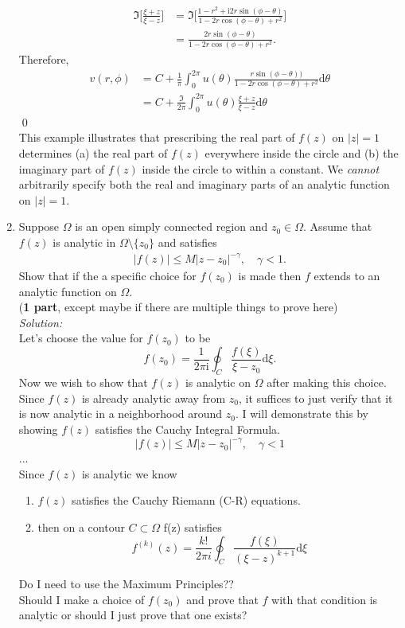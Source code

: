 \documentclass[10pt]{amsart}
\newcommand{\D}{\mathrm{d}}
\newcommand{\I}{\mathrm{i}}
\theoremstyle{nonumberplain}
\begin{document}
\begin{enumerate}[label={\bf {\arabic*}:}]
\begin{align*}
\Im \bigg[\frac {\xi + z}{\xi - z} \bigg] &= \Im \bigg[\frac {1 - r^2 + \I 2 r\sin(\phi - \theta)}{1 - 2r \cos (\phi - \theta) + r^2} \bigg] \\
	&= \frac {2 r\sin(\phi - \theta)}{1 - 2r \cos (\phi - \theta) + r^2}.
\end{align*}
Therefore, 
\begin{align*}
v(r, \phi) &= C + \frac 1 {\pi} \int_0^{2\pi} u(\theta) \frac{r\sin(\phi -\theta))}{1 - 2r \cos (\phi-\theta) + r^2} \D \theta \\
	&= C + \frac \Im {2\pi} \int_0^{2\pi} u(\theta) \frac {\xi + z}{\xi - z} \D \theta
\end{align*}
\qed \\
This example illustrates that prescribing the real part of $f(z)$ on $|z| = 1$ determines (a) the real part of $f(z)$ everywhere inside the circle and (b) the imaginary part of $f(z)$ inside the circle to within a constant.
We \textit{cannot} arbitrarily specify both the real and imaginary parts of an analytic function on $|z| = 1$.

\item Suppose $\Omega$ is an open simply connected region and $z_0 \in
  \Omega$.  Assume that $f(z)$ is analytic in $\Omega\setminus
  \{z_0\}$ and satisfies
  \begin{align*}
    |f(z)| \leq M |z - z_0|^{-\gamma}, \quad \gamma < 1.
  \end{align*}
  Show that if the a specific choice for $f(z_0)$ is made then $f$
  extends to an analytic function on $\Omega$. \\
(\textbf{1 part}, except maybe if there are multiple things to prove here) \\
\textit{Solution:} \\
Let's choose the value for $f(z_0)$ to be
$$f(z_0) = \frac 1 {2 \pi \I}\oint_C \frac {f(\xi)} {\xi - z_0} \D \xi.$$
Now we wish to show that $f(z)$ is analytic on $\Omega$ after making this choice.
Since $f(z)$ is already analytic away from $z_0$, it suffices to just verify that it is now analytic in a neighborhood around $z_0$.
I will demonstrate this by showing $f(z)$ satisfies the Cauchy Integral Formula.
$$|f(z)| \leq M |z - z_0|^{-\gamma}, \quad \gamma < 1$$
...\\
Since $f(z)$ is analytic we know
\begin{enumerate}
\item $f(z)$ satisfies the Cauchy Riemann (C-R) equations.
\item then on a contour $C \subset \Omega$ f(z) satisfies
$$
f^{(k)}(z) = \frac {k!}{2 \pi i} \oint_C \frac {f(\xi)}{(\xi - z)^{k + 1}}\D \xi
$$
\end{enumerate}
Do I need to use the Maximum Principles?? \\
Should I make a choice of $f(z_0)$ and prove that $f$ with that condition is analytic or should I just prove that one exists?


\end{enumerate}
\end{document}

